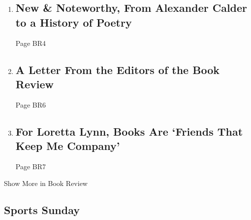 \begin{enumerate}
\def\labelenumi{\arabic{enumi}.}
\item
  \href{/2020/04/14/books/review/new-noteworthy-from-alexander-calder-to-a-history-of-poetry.html}{}

  \hypertarget{new--noteworthy-from-alexander-calder-to-a-history-of-poetry}{%
  \subsection{New \& Noteworthy, From Alexander Calder to a History of
  Poetry}\label{new--noteworthy-from-alexander-calder-to-a-history-of-poetry}}

  Page BR4
\item
  \href{/2020/04/13/books/review/coronavirus-books-publishing-industry.html}{}

  \hypertarget{a-letter-from-the-editors-of-the-book-review}{%
  \subsection{A Letter From the Editors of the Book
  Review}\label{a-letter-from-the-editors-of-the-book-review}}

  Page BR6
\item
  \href{/2020/04/16/books/review/loretta-lynn-by-the-book-interview.html}{}

  \hypertarget{for-loretta-lynn-books-are-friends-that-keep-me-company}{%
  \subsection{For Loretta Lynn, Books Are `Friends That Keep Me
  Company'}\label{for-loretta-lynn-books-are-friends-that-keep-me-company}}

  Page BR7
\end{enumerate}

Show More in Book Review

\hypertarget{sports-sunday}{%
\subsection{Sports Sunday}\label{sports-sunday}}

